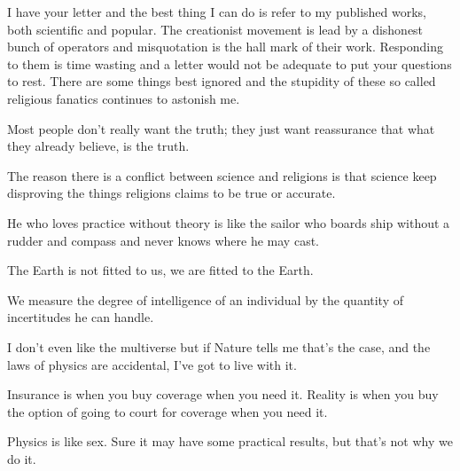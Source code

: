  	\begin{fquote}I have your letter and the best thing I can do is refer to my published works, both scientific and popular. The creationist movement is lead by a dishonest bunch of operators and misquotation is the hall mark of their work. Responding to them is time wasting and a letter would not be adequate to put your questions to rest. There are some things best ignored and the stupidity of these so called religious fanatics continues to astonish me.
 	\end{fquote}
 	
 	\begin{fquote}Most people don't really want the truth; they just want reassurance that what they already believe, is the truth.
 	\end{fquote}
 	
 	\begin{fquote}The reason there is a conflict between science and religions is that science keep disproving the things religions claims to be true or accurate.
 	\end{fquote}
 	
	\begin{fquote}He who loves practice without theory is like the sailor who boards ship without a rudder and compass and never knows where he may cast.
 	\end{fquote}
 	
 	\begin{fquote}The Earth is not fitted to us, we are fitted to the Earth.
 	\end{fquote}
 	
 	\begin{fquote}We measure the degree of intelligence of an individual by the quantity of incertitudes he can handle.
 	\end{fquote}
 	
 	\begin{fquote}I don't even like the multiverse but if Nature tells me that's the case, and the laws of physics are accidental, I've got to live with it.
 	\end{fquote}
 	
 	\begin{fquote}Insurance is when you buy coverage when you need it. Reality is when you buy the option of going to court for coverage when you need it.
 	\end{fquote}
 	
	\begin{fquote}Physics is like sex. Sure it may have some practical results, but that's not why we do it.
 	\end{fquote}
 	
